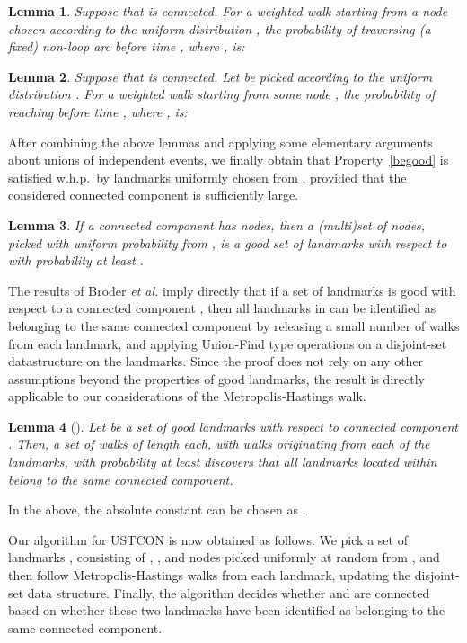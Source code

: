 \documentclass[11pt,a4paper]{article}
\newtheorem{lemma}{Lemma}
\newcommand{\Broder}{Broder \etal}
\newcommand{\etal}{\textsl{et al.}\xspace}
\renewcommand{\*}{\hspace*{5mm}}
\begin{document}
\begin{lemma}\label{lemA}
Suppose that  is connected. For a weighted walk  starting from a node chosen according to the uniform distribution , the probability of traversing (a fixed) non-loop arc  before time , where , is:

\end{lemma}

\begin{lemma}\label{lemB}
Suppose that  is connected. Let  be picked according to the uniform distribution . For a weighted walk  starting from some node , the probability of reaching  before time , where , is:

\end{lemma}

After combining the above lemmas and applying some elementary arguments about unions of independent events, we finally obtain that Property~\ref{begood} is satisfied w.h.p.\ by landmarks uniformly chosen from , provided that the considered connected component is sufficiently large.

\begin{lemma}\label{lemGood}
If a connected component  has  nodes, then a (multi)set of  nodes, picked with uniform probability from , is a good set of landmarks with respect to  with probability at least .
\end{lemma}


The results of \Broder imply directly that if a set of landmarks is good with respect to a connected component , then all landmarks in  can be identified as belonging to the same connected component by releasing a small number of walks from each landmark, and applying Union-Find type operations on a disjoint-set datastructure on the landmarks. Since the proof does not rely on any other assumptions beyond the properties of good landmarks, the result is directly applicable to our considerations of the Metropolis-Hastings walk.

\begin{lemma}[\cite{BKRU}]\label{bro}
Let  be a set of good landmarks with respect to connected component . Then, a set of walks of length  each, with  walks originating from each of the landmarks, with probability at least  discovers that all landmarks located within  belong to the same connected component.
\end{lemma}
\noindent
In the above, the absolute constant  can be chosen as .

Our algorithm for USTCON is now obtained as follows. We pick a set of landmarks , consisting of , , and  nodes picked uniformly at random from , and then follow  Metropolis-Hastings walks from each landmark, updating the disjoint-set data structure. Finally, the algorithm decides whether  and  are connected based on whether these two landmarks have been identified as belonging to the same connected component.
\end{document}
